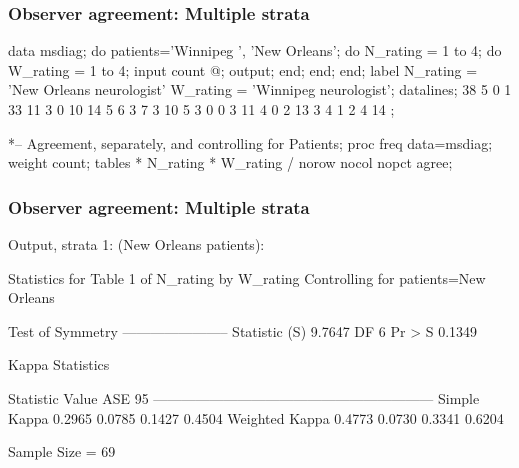 \begin{frame}[fragile]
  \frametitle{Observer agreement: Multiple strata}
\begin{Input}[fontsize=\footnotesize,label=\fbox{\texttt{msdiag.sas}},baselinestretch=0.8]
data msdiag;
  do patients='Winnipeg  ', 'New Orleans';
     do N_rating = 1 to 4;
        do W_rating = 1 to 4;
           input count @;
           output;
           end;
        end;
     end;
 label N_rating = 'New Orleans neurologist'
       W_rating = 'Winnipeg neurologist';
datalines;
38  5  0  1
33 11  3  0
10 14  5  6
 3  7  3 10
 5  3  0  0
 3 11  4  0
 2 13  3  4
 1  2  4 14
;

*-- Agreement, separately, and controlling for Patients;
proc freq data=msdiag;
   weight count;
   tables  * N_rating * W_rating / norow nocol nopct agree;
\end{Input}
\end{frame}

\begin{frame}[fragile]
  \frametitle{Observer agreement: Multiple strata}
Output, strata 1: (New Orleans patients):
\begin{Output}[baselinestretch=0.8,gobble=3]
           Statistics for Table 1 of N_rating by W_rating
                Controlling for patients=New Orleans

                         Test of Symmetry
                      -----------------------
                      Statistic (S)    9.7647
                      DF                    6
                      Pr > S           0.1349

                          Kappa Statistics
 
    Statistic          Value       ASE     95%
    ------------------------------------------------------------
    Simple Kappa      0.2965    0.0785       0.1427       0.4504
    Weighted Kappa    0.4773    0.0730       0.3341       0.6204

                          Sample Size = 69
\end{Output}
\end{frame}

